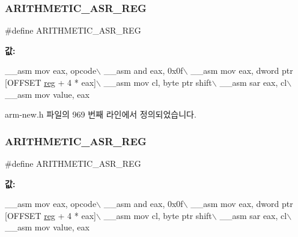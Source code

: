 \subsubsection{\texorpdfstring{A\+R\+I\+T\+H\+M\+E\+T\+I\+C\+\_\+\+A\+S\+R\+\_\+\+R\+EG}{ARITHMETIC\_ASR\_REG}\hspace{0.1cm}{\footnotesize\ttfamily [1/2]}}
{\footnotesize\ttfamily \#define A\+R\+I\+T\+H\+M\+E\+T\+I\+C\+\_\+\+A\+S\+R\+\_\+\+R\+EG}

{\bfseries 값\+:}
\begin{DoxyCode}
\_\_asm mov eax, opcode\(\backslash\)
        \_\_asm and eax, 0x0f\(\backslash\)
        \_\_asm mov eax, dword ptr [OFFSET \mbox{\hyperlink{_g_b_a_8h_ae29faba89509024ffd1a292badcedf2d}{reg}} + 4 * eax]\(\backslash\)
        \_\_asm mov cl, byte ptr shift\(\backslash\)
        \_\_asm sar eax, cl\(\backslash\)
        \_\_asm mov value, eax
\end{DoxyCode}


arm-\/new.\+h 파일의 969 번째 라인에서 정의되었습니다.

\mbox{\label{_g_b_a_8cpp_ab5041382af3adc9d16fb9d1018dd7c85}} 
\subsubsection{\texorpdfstring{A\+R\+I\+T\+H\+M\+E\+T\+I\+C\+\_\+\+A\+S\+R\+\_\+\+R\+EG}{ARITHMETIC\_ASR\_REG}\hspace{0.1cm}{\footnotesize\ttfamily [2/2]}}
{\footnotesize\ttfamily \#define A\+R\+I\+T\+H\+M\+E\+T\+I\+C\+\_\+\+A\+S\+R\+\_\+\+R\+EG}

{\bfseries 값\+:}
\begin{DoxyCode}
\_\_asm mov eax, opcode\(\backslash\)
        \_\_asm and eax, 0x0f\(\backslash\)
        \_\_asm mov eax, dword ptr [OFFSET \mbox{\hyperlink{_g_b_a_8h_ae29faba89509024ffd1a292badcedf2d}{reg}} + 4 * eax]\(\backslash\)
        \_\_asm mov cl, byte ptr shift\(\backslash\)
        \_\_asm sar eax, cl\(\backslash\)
        \_\_asm mov value, eax
\end{DoxyCode}
\mbox{\label{arm-new_8h_a6e5dde54bbb146172614913781ede32e}} 
